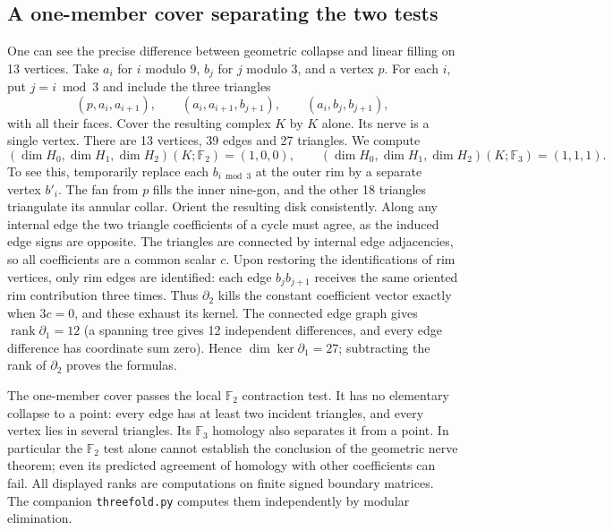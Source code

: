 \subsection{A one-member cover separating the two tests}
One can see the precise difference between geometric collapse and linear filling on 13 vertices. Take $a_i$ for $i$ modulo $9$, $b_j$ for $j$ modulo $3$, and a vertex $p$. For each $i$, put $j=i\bmod3$ and include the three triangles
\[
 (p,a_i,a_{i+1}),\qquad (a_i,a_{i+1},b_{j+1}),\qquad
 (a_i,b_j,b_{j+1}),
\]
with all their faces. Cover the resulting complex $K$ by $K$ alone. Its nerve is a single vertex. There are 13 vertices, 39 edges and 27 triangles. We compute
\[
 (\dim H_0,\dim H_1,\dim H_2)(K;\mathbb F_2)=(1,0,0),
 \qquad
 (\dim H_0,\dim H_1,\dim H_2)(K;\mathbb F_3)=(1,1,1).
\]
To see this, temporarily replace each $b_{i\bmod3}$ at the outer rim by a separate vertex $b'_i$. The fan from $p$ fills the inner nine-gon, and the other 18 triangles triangulate its annular collar. Orient the resulting disk consistently. Along any internal edge the two triangle coefficients of a cycle must agree, as the induced edge signs are opposite. The triangles are connected by internal edge adjacencies, so all coefficients are a common scalar $c$. Upon restoring the identifications of rim vertices, only rim edges are identified: each edge $b_jb_{j+1}$ receives the same oriented rim contribution three times. Thus $\partial_2$ kills the constant coefficient vector exactly when $3c=0$, and these exhaust its kernel. The connected edge graph gives $\operatorname{rank}\partial_1=12$ (a spanning tree gives 12 independent differences, and every edge difference has coordinate sum zero). Hence $\dim\ker\partial_1=27$; subtracting the rank of $\partial_2$ proves the formulas.

The one-member cover passes the local $\mathbb F_2$ contraction test. It has no elementary collapse to a point: every edge has at least two incident triangles, and every vertex lies in several triangles. Its $\mathbb F_3$ homology also separates it from a point. In particular the $\mathbb F_2$ test alone cannot establish the conclusion of the geometric nerve theorem; even its predicted agreement of homology with other coefficients can fail. All displayed ranks are computations on finite signed boundary matrices. The companion \texttt{threefold.py} computes them independently by modular elimination.
